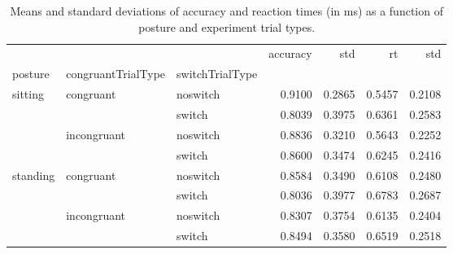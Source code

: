 \begin{table}
\centering
\caption{Means and standard deviations of accuracy and reaction times (in ms) as a function of posture and experiment trial types.}
\label{table-task-switching-replication-reaction-time}
\begin{tabular}{lllrrrr}
\toprule
         &             &        & accuracy &    std &     rt &    std \\
posture & congruantTrialType & switchTrialType &          &        &        &        \\
\midrule
sitting & congruant & noswitch &   0.9100 & 0.2865 & 0.5457 & 0.2108 \\
         &             & switch &   0.8039 & 0.3975 & 0.6361 & 0.2583 \\
         & incongruant & noswitch &   0.8836 & 0.3210 & 0.5643 & 0.2252 \\
         &             & switch &   0.8600 & 0.3474 & 0.6245 & 0.2416 \\
standing & congruant & noswitch &   0.8584 & 0.3490 & 0.6108 & 0.2480 \\
         &             & switch &   0.8036 & 0.3977 & 0.6783 & 0.2687 \\
         & incongruant & noswitch &   0.8307 & 0.3754 & 0.6135 & 0.2404 \\
         &             & switch &   0.8494 & 0.3580 & 0.6519 & 0.2518 \\
\bottomrule
\end{tabular}
\end{table}
